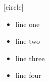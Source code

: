 \documentclass{beamer}
\begin{document}
{
[circle]
\begin{frame}[t]
\begin{itemize}[<+>]
\item line one
\item line two
\item line three
\item line four
\end{itemize}
\end{frame}
}
\end{document}
